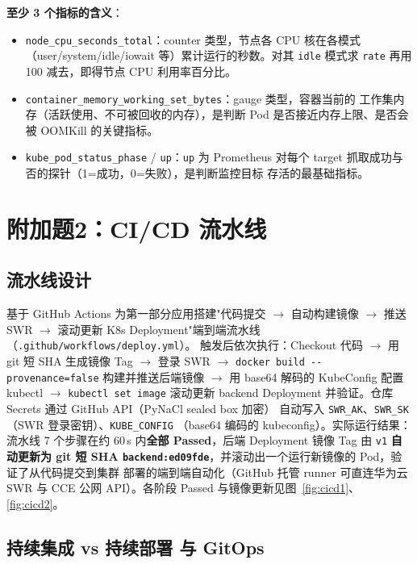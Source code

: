 \textbf{至少 3 个指标的含义}：
\begin{itemize}
  \item \lstinline!node_cpu_seconds_total!：counter 类型，节点各 CPU 核在各模式
  （user/system/idle/iowait 等）累计运行的秒数。对其 \lstinline!idle! 模式求
  \lstinline!rate! 再用 100 减去，即得节点 CPU 利用率百分比。
  \item \lstinline!container_memory_working_set_bytes!：gauge 类型，容器当前的
  工作集内存（活跃使用、不可被回收的内存），是判断 Pod 是否接近内存上限、是否会被
  OOMKill 的关键指标。
  \item \lstinline!kube_pod_status_phase! / \lstinline!up!：\lstinline!up! 为
  Prometheus 对每个 target 抓取成功与否的探针（1=成功，0=失败），是判断监控目标
  存活的最基础指标。
\end{itemize}

\section{附加题2：CI/CD 流水线}

\subsection{流水线设计}

基于 GitHub Actions 为第一部分应用搭建"代码提交 $\to$ 自动构建镜像 $\to$ 推送 SWR
$\to$ 滚动更新 K8s Deployment"端到端流水线（\lstinline!.github/workflows/deploy.yml!）。
触发后依次执行：Checkout 代码 $\to$ 用 git 短 SHA 生成镜像 Tag $\to$ 登录 SWR
$\to$ \lstinline!docker build --provenance=false! 构建并推送后端镜像 $\to$ 用
base64 解码的 KubeConfig 配置 kubectl $\to$ \lstinline!kubectl set image! 滚动更新
backend Deployment 并验证。仓库 Secrets 通过 GitHub API（PyNaCl sealed box 加密）
自动写入 \lstinline!SWR_AK!、\lstinline!SWR_SK!（SWR 登录密钥）、\lstinline!KUBE_CONFIG!
（base64 编码的 kubeconfig）。实际运行结果：流水线 7 个步骤在约 60\,s 内\textbf{全部
Passed}，后端 Deployment 镜像 Tag 由 \lstinline!v1! \textbf{自动更新为 git 短 SHA
\lstinline!backend:ed09fde!}，并滚动出一个运行新镜像的 Pod，验证了从代码提交到集群
部署的端到端自动化（GitHub 托管 runner 可直连华为云 SWR 与 CCE 公网 API）。各阶段
Passed 与镜像更新见图~\ref{fig:cicd1}、\ref{fig:cicd2}。


\subsection{持续集成 vs 持续部署 与 GitOps}

